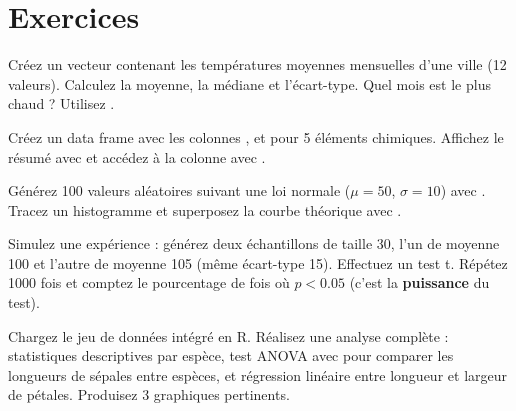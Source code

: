 \section{Exercices}

\begin{exercice}[$\star$]
Cr\'eez un vecteur contenant les temp\'eratures moyennes mensuelles d'une ville
(12 valeurs). Calculez la moyenne, la m\'ediane et l'\'ecart-type. Quel mois est le
plus chaud ? Utilisez .
\end{exercice}

\begin{exercice}[$\star$]
Cr\'eez un data frame avec les colonnes ,  et
 pour 5 \'el\'ements chimiques. Affichez le r\'esum\'e avec
 et acc\'edez \`a la colonne  avec \ri{\$}.
\end{exercice}

\begin{exercice}[$\star\star$]
G\'en\'erez 100 valeurs al\'eatoires suivant une loi normale ($\mu = 50$, $\sigma = 10$)
avec . Tracez un histogramme et superposez la courbe th\'eorique avec
.
\end{exercice}

\begin{exercice}[$\star\star$]
Simulez une exp\'erience : g\'en\'erez deux \'echantillons de taille 30, l'un de moyenne
100 et l'autre de moyenne 105 (m\^eme \'ecart-type 15). Effectuez un test t.
R\'ep\'etez 1000 fois et comptez le pourcentage de fois o\`u $p < 0.05$
(c'est la \textbf{puissance} du test).
\end{exercice}

\begin{exercice}[$\star\star\star$]
Chargez le jeu de donn\'ees int\'egr\'e  en R. R\'ealisez une analyse compl\`ete :
statistiques descriptives par esp\`ece, test ANOVA avec  pour comparer les
longueurs de s\'epales entre esp\`eces, et r\'egression lin\'eaire entre longueur et
largeur de p\'etales. Produisez 3 graphiques pertinents.
\end{exercice}

